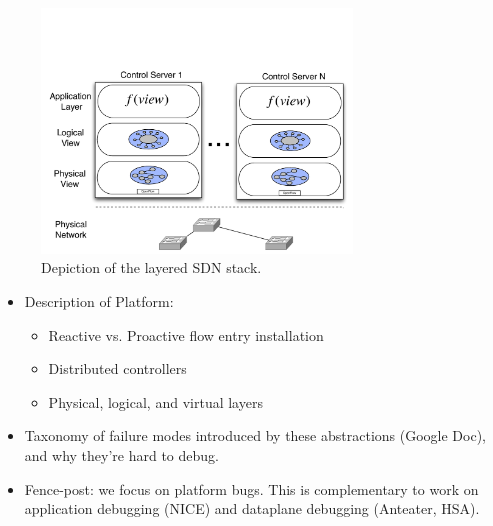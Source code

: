 \begin{figure}[t]
    \hspace{-10pt}
    \includegraphics[width=3.25in]{../diagrams/architecture/SDN_stack.pdf}
    \caption[]{\label{fig:basicarch} Depiction of the layered SDN stack.} 
\end{figure}

\begin{itemize}
\item Description of Platform: 
\begin{itemize}
   \item Reactive vs. Proactive flow entry installation
   \item Distributed controllers
   \item Physical, logical, and virtual layers
\end{itemize}
\item Taxonomy of failure modes introduced by these abstractions (Google Doc),
and why they're hard to debug.
\item Fence-post: we focus on platform bugs. This is complementary to work on
application debugging (NICE) and dataplane debugging (Anteater, HSA).
\end{itemize}
